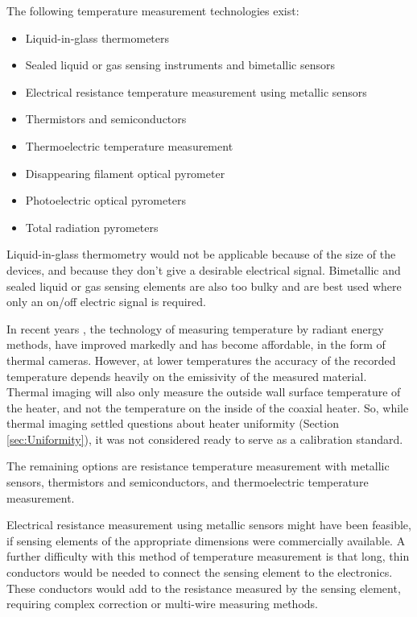 The following temperature measurement technologies exist:
\begin{itemize}
	\item Liquid-in-glass thermometers
	\item Sealed liquid or gas sensing instruments and bimetallic sensors
	\item Electrical resistance temperature measurement using metallic sensors
	\item Thermistors and semiconductors
	\item Thermoelectric temperature measurement
	\item Disappearing filament optical pyrometer
	\item Photoelectric optical pyrometers
	\item Total radiation pyrometers
\end{itemize}

Liquid-in-glass thermometry would not be applicable because of the size of the
devices, and because they don't give a desirable electrical signal. Bimetallic
and sealed liquid or gas sensing elements are also too bulky and are best used
where only an on/off electric signal is required.

In recent years , the technology of measuring temperature by
radiant energy methods, have improved markedly and has become affordable, in the
form of thermal cameras. However, at lower temperatures the accuracy of the
recorded temperature depends heavily on the emissivity of the measured material.
Thermal imaging will also only measure the outside wall surface temperature of
the heater, and not the temperature on the inside of the coaxial heater. So,
while thermal imaging settled questions about heater uniformity (Section
\ref{sec:Uniformity}), it was not considered ready to serve as a calibration
standard.

The remaining options are resistance temperature measurement with metallic sensors,
thermistors and semiconductors, and thermoelectric temperature measurement.

Electrical resistance measurement using metallic sensors might have been
feasible, if sensing elements of the appropriate dimensions were commercially
available. A further difficulty with this method of temperature measurement is
that long, thin conductors would be needed to connect the sensing element to the
electronics. These conductors would add to the resistance measured by the
sensing element, requiring complex correction or multi-wire measuring methods.

